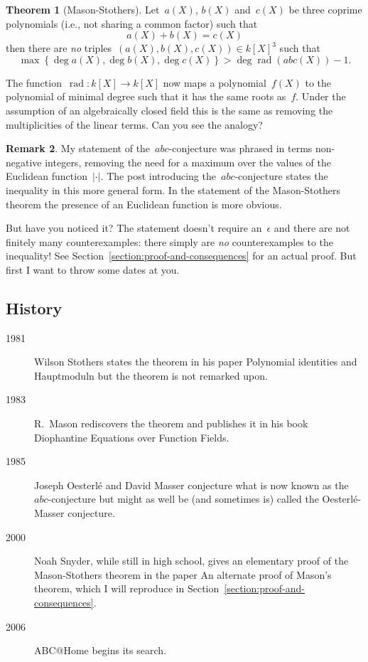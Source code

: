 \documentclass[11pt, a4paper, openany, oneside, article]{memoir}
\theoremstyle{definition}
\newtheorem{theorem}{Theorem}
\newtheorem{remark}[theorem]{Remark}
\DeclareMathOperator\rad{rad}
\begin{document}
\begin{theorem}[Mason-Stothers]
  \label{theorem:mason-stothers}
  Let~$a(X)$, $b(X)$ and~$c(X)$ be three coprime polynomials (i.e., not sharing a common factor) such that
  \begin{equation}
    a(X)+b(X)=c(X)
  \end{equation}
  then there are \emph{no} triples~$(a(X),b(X),c(X))\in k[X]^3$ such that
  \begin{equation}
    \max\left\{ \deg a(X),\deg b(X),\deg c(X) \right\}>\deg\rad(abc(X))-1.
  \end{equation}
\end{theorem}

The function~$\rad\colon k[X]\to k[X]$ now maps a polynomial~$f(X)$ to the polynomial of minimal degree such that it has the same roots as~$f$. Under the assumption of an algebraically closed field this is the same as removing the multiplicities of the linear terms. Can you see the analogy?

\begin{remark}
  My statement of the~$abc$\nobreakdash-conjecture was phrased in terms non-negative integers, removing the need for a maximum over the values of the Euclidean function~$|\cdot|$. The post introducing the~$abc$\nobreakdash-conjecture states the inequality in this more general form. In the statement of the Mason-Stothers theorem the presence of an Euclidean function is more obvious.
\end{remark}

But have you noticed it? The statement doesn't require an~$\epsilon$ and there are not finitely many counterexamples: there simply are \emph{no} counterexamples to the inequality! See Section~\ref{section:proof-and-consequences} for an actual proof. But first I want to throw some dates at you.


\subsection{History}

\begin{description}
  \item[1981] Wilson Stothers states the theorem in his paper Polynomial identities and Hauptmoduln but the theorem is not remarked upon.
  \item[1983] R.\ Mason rediscovers the theorem and publishes it in his book Diophantine Equations over Function Fields.
  \item[1985] Joseph Oesterl\'e and David Masser conjecture what is now known as the~$abc$\nobreakdash-conjecture but might as well be (and sometimes is) called the Oesterl\'e-Masser conjecture.
  \item[2000] Noah Snyder, while still in high school, gives an elementary proof of the Mason-Stothers theorem in the paper An alternate proof of Mason's theorem, which I will reproduce in Section~\ref{section:proof-and-consequences}.
  \item[2006] ABC@Home begins its search.
\end{description}
\end{document}
